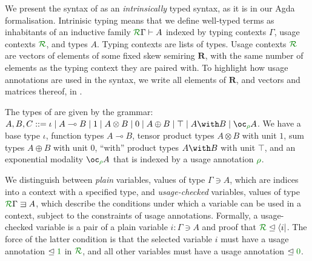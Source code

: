 \documentclass[submission,copyright,creativecommons]{eptcs}
\begin{document}
We present the syntax of \name{} as an \emph{intrinsically} typed
syntax, as it is in our Agda formalisation. Intrinisic typing means
that we define well-typed terms as inhabitants of an inductive family
$\ctx\Gamma{R} \vdash A$ indexed by typing contexts $\Gamma$, usage
contexts $\resctx{R}$, and types $A$. Typing contexts are lists of
types. Usage contexts $\resctx{R}$ are vectors of elements of some
fixed skew semiring $\mathbf R$, with the same number of elements as
the typing context they are paired with. To highlight how usage
annotations are used in the syntax, we write all elements of
$\mathbf R$, and vectors and matrices thereof, in .



The types of \name{} are given by the grammar:
$  A,B,C ::= \iota \mid A \multimap B \mid 1 \mid A \otimes B \mid 0 \mid A \oplus B \mid \top \mid A \with B \mid \excl{\rho} A$. 
We have a base type $\iota$, function types $A \multimap B$, tensor
product types $A \otimes B$ with unit $1$, sum types $A \oplus B$ with
unit $0$, ``with'' product types $A \with B$ with unit $\top$, and an
exponential modality $\excl{\rho} A$ that is indexed by a usage
annotation $\rescomment{\rho}$.

We distinguish between \emph{plain} variables, values of type
$\Gamma \ni A$, which are indices into a context with a specified
type, and \emph{usage-checked} variables, values of type
$\ctx{\Gamma}{R} \lvar A$, which describe the conditions under which a
variable can be used in a context, subject to the constraints of usage
annotations. Formally, a usage-checked variable is a pair of a plain
variable $i : \Gamma \ni A$ and proof that
$\resctx R \subres \langle i \rvert$. The force of the latter
condition is that the selected variable $i$ must have a usage
annotation $\subres \rescomment 1$ in $\resctx{R}$, and all other
variables must have a usage annotation $\subres \rescomment 0$.

\end{document}
